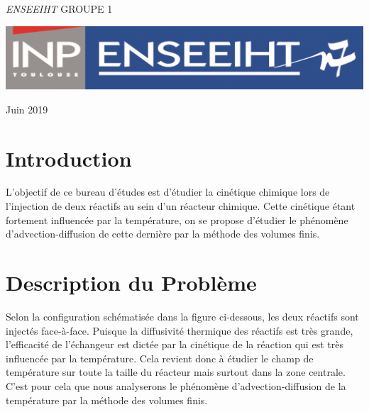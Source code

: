 \documentclass[a4paper,oneside]{article}
\begin{document}
\begin{titlepage}
	\vspace{0.5\baselineskip} %

	\textit{ENSEEIHT} %
	GROUPE 1
	\vfill %


	\includegraphics[scale=0.3]{logoN7.png} %

	\vspace{0.3\baselineskip} %

Juin 2019 %
\end{titlepage}
\newpage

\tableofcontents
\newpage

\section{Introduction}

L'objectif de ce bureau d'études est d'étudier la cinétique chimique lors de l'injection de deux réactifs au sein 
d'un réacteur chimique. Cette cinétique étant fortement influencée par la température, on se propose d'étudier le phénomène 
d'advection-diffusion de cette dernière par la méthode des volumes finis.

\section{Description du Problème}

Selon la configuration schématisée dans la figure ci-dessous, les deux réactifs sont injectés face-à-face.
Puisque la diffusivité thermique des réactifs est très grande, l'efficacité de l'échangeur est dictée par la cinétique de la réaction qui est très influencée par la température. Cela revient donc à étudier le champ de température sur toute la taille du réacteur mais surtout dans la zone centrale. C'est pour cela que nous analyserons le phénomène d'advection-diffusion de la température par la méthode des volumes finis. 
\end{document}

